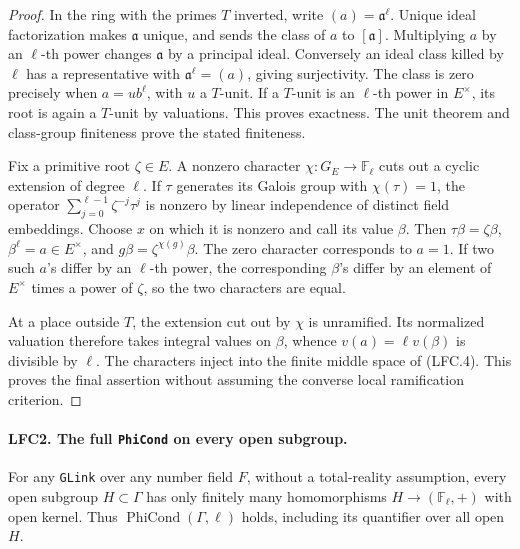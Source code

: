 \documentclass[11pt,a4paper]{article}
\numberwithin{equation}{section}
\theoremstyle{remark}\newtheorem{remark}[theorem]{Remark}
\begin{document}
\begin{proof}
In the ring with the primes \(T\) inverted, write
\((a)=\mathfrak a^\ell\).  Unique ideal factorization makes
\(\mathfrak a\) unique, and sends the class of \(a\) to
\([\mathfrak a]\).  Multiplying \(a\) by an \(\ell\)-th power
changes \(\mathfrak a\) by a principal ideal.  Conversely an ideal
class killed by \(\ell\) has a representative with
\(\mathfrak a^\ell=(a)\), giving surjectivity.  The class is zero
precisely when \(a=u b^\ell\), with \(u\) a \(T\)-unit.
If a \(T\)-unit is an \(\ell\)-th power in \(E^\times\),
its root is again a \(T\)-unit by valuations.  This proves
exactness.  The unit theorem and class-group finiteness prove
the stated finiteness.

Fix a primitive root \(\zeta\in E\).  A nonzero character
\(\chi:G_E\to\mathbb F_\ell\) cuts out a cyclic extension of
degree \(\ell\).  If \(\tau\) generates its Galois group with
\(\chi(\tau)=1\), the operator
\(\sum_{j=0}^{\ell-1}\zeta^{-j}\tau^j\) is nonzero by linear
independence of distinct field embeddings.  Choose \(x\) on
which it is nonzero and call its value \(\beta\).
Then \(\tau\beta=\zeta\beta\), \(\beta^\ell=a\in E^\times\),
and \(g\beta=\zeta^{\chi(g)}\beta\).
The zero character corresponds to \(a=1\).  If two such
\(a\)'s differ by an \(\ell\)-th power, the corresponding
\(\beta\)'s differ by an element of \(E^\times\) times a power
of \(\zeta\), so the two characters are equal.

At a place outside \(T\), the extension cut out by \(\chi\)
is unramified.  Its normalized valuation therefore takes integral
values on \(\beta\), whence \(v(a)=\ell v(\beta)\) is divisible
by \(\ell\).  The characters inject into the finite middle
space of (LFC.4).  This proves the final assertion without
assuming the converse local ramification criterion.
\end{proof}

\paragraph{LFC2. The full \texttt{Phi\allowbreak Cond} on every open subgroup.}
\label{claim:LFC2}
For any \texttt{GLink} over any number field \(F\), without
a total-reality assumption, every open subgroup \(H\subset\Gamma\)
has only finitely many homomorphisms \(H\to(\mathbb F_\ell,+)\)
with open kernel.  Thus \(\operatorname{PhiCond}(\Gamma,\ell)\)
holds, including its quantifier over all open \(H\).
\end{document}

